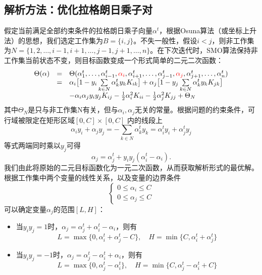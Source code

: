 \subsection{解析方法：优化拉格朗日乘子对}
假定当前满足全部约束条件的拉格朗日乘子向量$\alpha^t$，根据Osuna算法（或坐标上升法）的思想，我们选定工作集为$B=\{i,j\}$。不失一般性，假设$i<j$，则非工作集为$N=\{1,2,\ldots,i-1, i+1,\ldots,j-1,j+1,\ldots,n\}$。在下次迭代时，SMO算法保持非工作集当前状态不变，则目标函数变成一个形式简单的二元二次函数：
\begin{equation}
    \begin{array}{lll}
    \Theta(\alpha) & = & \Theta(\alpha_1^t,\ldots, \alpha_{i-1}^t, \textcolor{red}{\alpha_i},\alpha_{i+1}^t,\ldots,\alpha_{j-1}^t,\textcolor{red}{\alpha_j},\alpha_{j+1}^t,\ldots,\alpha_n^t) \\
    & = & \alpha_i \big[ 1 - y_i \sum\limits_{k\in N} \alpha_k^t y_k K_{ik} \big] + \alpha_j \big[1 - y_j \sum\limits_{k\in N} \alpha_k^t y_k K_{jk}\big]\\
    && - \alpha_i \alpha_j y_i y_j K_{ij} - \frac{1}{2} \alpha_i^2 K_{ii} - \frac{1}{2} \alpha_j^2 K_{jj} + \Theta_N
    \end{array}
\end{equation}
其中$\Theta_N$是只与非工作集N有关，但与$\alpha_i,\alpha_j$无关的常量。根据问题的约束条件，可行域被限定在矩形区域$[0,C]\times[0,C]$ 内的线段上
\begin{equation}
    \alpha_i y_i + \alpha_j y_j = -\sum\limits_{k\in N} \alpha_k^t y_k = \alpha_i^t y_i + \alpha_j^t y_j
\end{equation}
等式两端同时乘以$y_j$可得
\begin{equation}
    \alpha_j = \alpha_j^t + y_i y_j (\alpha_i^t - \alpha_i).
\end{equation}
我们由此将原始的二元目标函数化为一元二次函数，从而获取解析形式的最优解。根据工作集中两个变量的线性关系，以及变量的边界条件
\begin{equation}
    \left\{
    \begin{array}{c}
      0\le \alpha_i \le C \\
      0\le \alpha_j \le C
    \end{array}
    \right.
\end{equation}
可以确定变量$\alpha_j$的范围$[L, H]$：
\begin{itemize}
  \item 当$y_i y_j = 1$时，$\alpha_j = \alpha_j^t + \alpha_i^t - \alpha_i$，则有
      \begin{equation}
        L = \max\{0,\alpha_i^t + \alpha_j^t - C\},\quad H = \min\{C,\alpha_i^t + \alpha_j^t\}
      \end{equation}
  \item 当$y_i y_j = -1$时，$\alpha_j = \alpha_j^t - \alpha_i^t + \alpha_i$，则有
      \begin{equation}
        L = \max\{0,\alpha_j^t - \alpha_i^t\},\quad H = \min\{C,\alpha_j^t-\alpha_i^t+C\}
      \end{equation}
\end{itemize}


